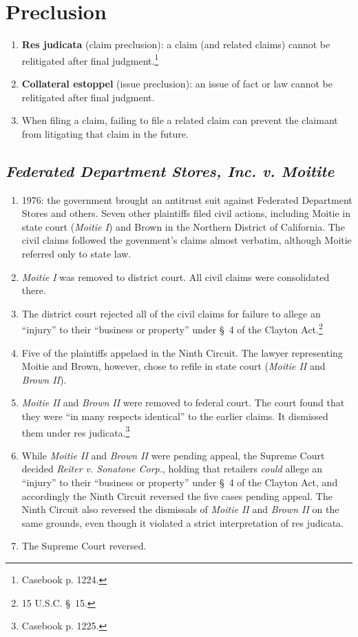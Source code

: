 \section{Preclusion}

\begin{enumerate}
    \item \textbf{Res judicata} (claim preclusion): a claim (and related 
    claims) cannot be relitigated after final judgment.\footnote{Casebook p. 
    1224.}
    \item \textbf{Collateral estoppel} (issue preclusion): an issue of fact or 
    law cannot be relitigated after final judgment.
    \item When filing a claim, failing to file a related claim can prevent 
    the claimant from litigating that claim in the future.
\end{enumerate}

\subsection{\emph{Federated Department Stores, Inc. v. Moitite}}

\begin{enumerate}
    \item 1976: the government brought an antitrust suit against Federated 
    Department Stores and others. Seven other plaintiffs filed civil actions, 
    including Moitie in state court (\emph{Moitie I}) and Brown in the 
    Northern District of California. The civil claims followed the govenment's 
    claims almost verbatim, although Moitie referred only to state law.
    \item \emph{Moitie I} was removed to district court. All civil claims were 
    consolidated there.
    \item The district court rejected all of the civil claims for failure to 
    allege an ``injury'' to their ``business or property'' under \S\ 4 of the 
    Clayton Act.\footnote{15 U.S.C. \S\ 15.}
    \item Five of the plaintiffs appelaed in the Ninth Circuit. The lawyer 
    representing Moitie and Brown, however, chose to refile in state court 
    (\emph{Moitie II} and \emph{Brown II}).
    \item \emph{Moitie II} and \emph{Brown II} were removed to federal court. 
    The court found that they were ``in many respects identical'' to the 
    earlier claims. It dismissed them under res judicata.\footnote{Casebook p. 
    1225.}
    \item While \emph{Moitie II} and \emph{Brown II} were pending appeal, the 
    Supreme Court decided \emph{Reiter v. Sonatone Corp.}, holding that 
    retailers \emph{could} allege an ``injury'' to their ``business or 
    property'' under \S\ 4 of the Clayton Act, and accordingly the Ninth 
    Circuit reversed the five cases pending appeal. The Ninth Circuit also 
    reversed the dismissals of \emph{Moitie II} and \emph{Brown II} on the 
    same grounds, even though it violated a strict interpretation of res 
    judicata.
    \item The Supreme Court reversed.
\end{enumerate}
